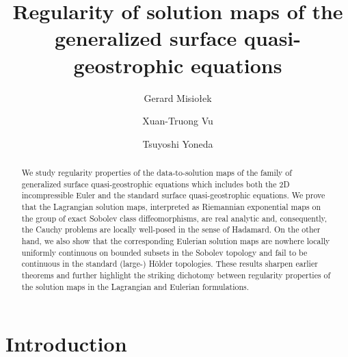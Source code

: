 \documentclass[11pt]{amsart}
\numberwithin{equation}{section}
\begin{document}
   \title{Regularity of solution maps of the generalized surface quasi-geostrophic equations}
	\author[]{ Gerard Misio\l{}ek}
	\address[GM]{Department of Mathematics, 
    University of Notre Dame, Notre Dame, IN 46556, USA 
    and 
    Institute for Mathematical Sciences, 
    Stony Brook University, Stony Brook, NY 11794-3660, USA 
	}
	\author[]{ Xuan-Truong Vu}
	\address[TV]{Department of Mathematics, Statistics, and Computer Science, University of Illinois at Chicago, Chicago, Illinois 60607, U.S.A.
	}
  	\author[]{Tsuyoshi Yoneda}
	\address[TY]{Graduate School of Economics, Hitotsubashi University, 2-1 Naka, Kunitachi, Tokyo 186-8601, Japan
	}

	\begin{abstract}
We study regularity properties of the data-to-solution maps of the family of generalized surface quasi-geostrophic equations which includes both the 2D incompressible Euler and the standard surface quasi-geostrophic equations. 
% 
We prove that the Lagrangian solution maps, interpreted as Riemannian exponential maps on the group of exact Sobolev class diffeomorphisms, are real analytic 
and, consequently, the Cauchy problems are locally well-posed in the sense of Hadamard. 
% 
On the other hand, we also show that the corresponding Eulerian solution maps are nowhere locally uniformly continuous on bounded subsets in the Sobolev topology and fail to be continuous in the standard (large-) H\"older topologies. 
% 
These results sharpen earlier theorems and further highlight the striking dichotomy between regularity properties of the solution maps in the Lagrangian and Eulerian formulations. 
\end{abstract}
    \maketitle
\section{Introduction}\label{intro}
\end{document}
